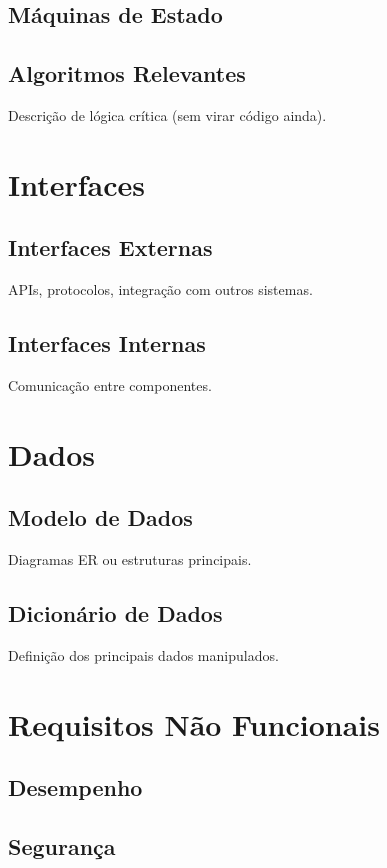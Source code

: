 \subsection{Máquinas de Estado}

\subsection{Algoritmos Relevantes}
Descrição de lógica crítica (sem virar código ainda).

\section{Interfaces}

\subsection{Interfaces Externas}
APIs, protocolos, integração com outros sistemas.

\subsection{Interfaces Internas}
Comunicação entre componentes.

\section{Dados}

\subsection{Modelo de Dados}
Diagramas ER ou estruturas principais.

\subsection{Dicionário de Dados}
Definição dos principais dados manipulados.

\section{Requisitos Não Funcionais}

\subsection{Desempenho}
\subsection{Segurança}
